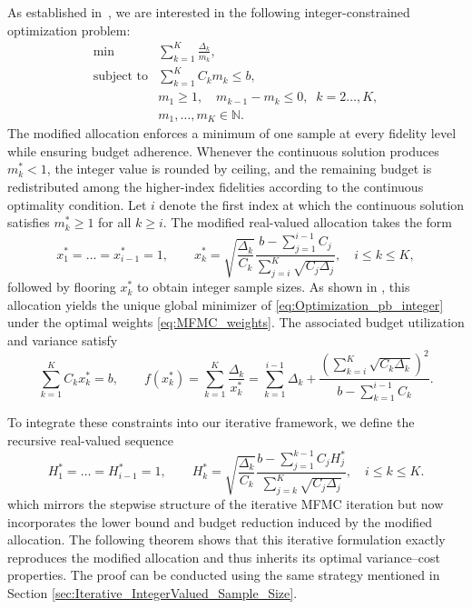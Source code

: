 As established in~\cite{GrGuJuWa:2023}, we are interested in the following integer-constrained optimization problem:
%
\begin{equation}\label{eq:Optimization_pb_integer}
    \begin{array}{ll}
    \min  &\sum_{k=1}^K\frac{\Delta_k}{m_k},\\
       \text{subject to} &\displaystyle\sum\limits_{k=1}^K C_km_k\le b,\\[2pt]
       &\displaystyle m_1\ge 1,\quad \displaystyle m_{k-1}-m_k\le 0, \;\; k=2\ldots,K,\\
       &m_1,\ldots, m_K\in \mathbb{N}.
    \end{array}
\end{equation}
%
The modified allocation enforces a minimum of one sample at every fidelity level while ensuring budget adherence. Whenever the continuous solution produces $m_k^* < 1$, the integer value is rounded by ceiling, and the remaining budget is redistributed among the higher-index fidelities according to the continuous optimality condition. Let $i$ denote the first index at which the continuous solution satisfies $m_k^* \ge 1$ for all $k \ge i$. The modified real-valued allocation takes the form
%
\begin{equation}
    \label{eq:Modified_sample_size_floor_real_valued}
    x_1^* =\ldots=x_{i-1}^*= 1, \qquad x_k^* = \sqrt{\dfrac{\Delta_k}{C_k}}
        \dfrac{b - \sum_{j=1}^{i-1} C_j}
        {\sum_{j=i}^{K} \sqrt{C_j \Delta_j}},\quad  i \le k \le K,
\end{equation}
%
followed by flooring $x_k^*$ to obtain integer sample sizes. As shown in \cite{GrGuJuWa:2023}, this allocation yields the unique global minimizer of \eqref{eq:Optimization_pb_integer} under the optimal weights \eqref{eq:MFMC_weights}. The associated budget utilization and variance satisfy
%
\begin{equation}\label{eq:Modified_f_real_valued}
    \sum_{k=1}^K C_k x_k^* = b, 
    \qquad 
    f(x_k^*) = \sum_{k=1}^K \frac{\Delta_k}{x_k^*}
    = \sum_{k=1}^{i-1} \Delta_k 
    + \frac{\left(\sum_{k=i}^K \sqrt{C_k \Delta_k}\right)^2}
    {b - \sum_{k=1}^{i-1} C_k}.
\end{equation}
%



To integrate these constraints into our iterative framework, we define the recursive real-valued sequence
\begin{equation}
    \label{eq:Modified_sample_size_iterative_real_valued}
    H_1^* = \ldots = H_{i-1}^* =1, \qquad H_k^*=\sqrt{\frac{\Delta_k}{C_k}}\frac{b-\sum_{j=1}^{k-1}C_j  H_j^* }{\sum_{j=k}^{K}\sqrt{C_j\Delta_j}}, \quad i\le k\le K.
\end{equation}
which mirrors the stepwise structure of the iterative MFMC iteration but now incorporates the lower bound and budget reduction induced by the modified allocation. The following theorem shows that this iterative formulation exactly reproduces the modified allocation and thus inherits its optimal variance--cost properties.  The proof can be conducted using the same strategy mentioned in Section \ref{sec:Iterative_IntegerValued_Sample_Size}.

